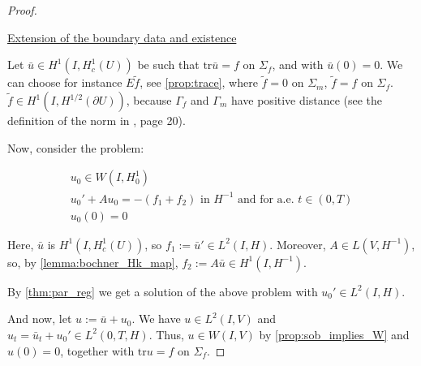 \documentclass[english,a4paper,12pt,oneside]{scrbook}
\theoremstyle{break}
\newenvironment{mproof}[1][\proofname]{%
  \begin{proof}[#1]$ $\par\nobreak\ignorespaces
}{%
  \end{proof}
}
\renewcommand*{\proofname}{Proof}
\theoremstyle{remark}
\newcommand{\tr}{\text{tr}}
\begin{document}
\begin{mproof}

\underline{Extension of the boundary data and existence}

Let $\bar{u}\in H^1(I,H^1_c(U))$ be such that $\tr \bar{u} =f$ on $\Sigma_f$, and with $\bar{u}(0)=0$. We can choose for instance $E\tilde{f}$, see \cref{prop:trace}, where $\tilde{f}=0$ on $\Sigma_m$, $\tilde{f}=f$ on $\Sigma_f$. $\tilde{f} \in H^1(I,H^{1/2}(\partial U))$, because $\Gamma_f$ and $\Gamma_m$ have positive distance (see the definition of the norm in \cite{grisvard}, page 20).  

%
%

Now, consider the problem: 

\begin{align}
u_0 \in W(I,H^1_0) \\
u_0' + A u_0 = -(f_1+f_2) \text{ in }H^{-1} \text{ and for a.e. } t \in (0,T) \\
u_0(0)=0
\end{align}

Here, $\bar{u}$ is $H^1(I,H^1_c(U))$, so $f_1:=\bar{u}' \in L^2(I,H)$. Moreover, $A \in L(V, H^{-1})$, so, by \cref{lemma:bochner_Hk_map}, $f_2:=A\bar{u} \in H^1(I, H^{-1})$.

By \cref{thm:par_reg} we get a solution of the above problem with $u_0' \in L^2(I, H)$. 

And now, let $u:=\bar{u}+u_0$. We have $u \in L^2(I, V)$ and $u_t=\bar{u}_t + u_0' \in L^2(0,T,H)$. Thus, $u \in W(I,V)$ by \cref{prop:sob_implies_W} and $u(0)=0$, together with $\tr u = f$ on $\Sigma_f$. 


\end{mproof}
\end{document}
